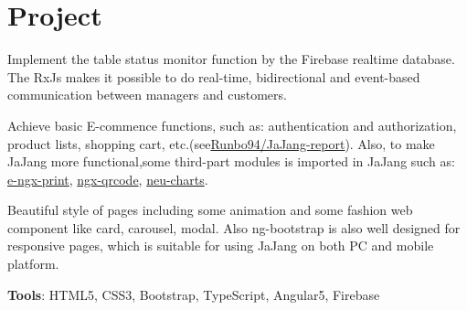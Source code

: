 \documentclass[letterpaper]{deedy-resume} %
\begin{document}
\hfill
%
%
\begin{minipage}[t]{0.66\textwidth} %


\section{Project}

\vspace{\topsep} %
\begin{tightitemize}
\item Implement the table status monitor function by the Firebase realtime database. The RxJs makes it possible to do real-time, bidirectional and event-based communication between managers and customers.
\item Achieve basic E-commence functions, such as: authentication and authorization, product lists, shopping cart, etc.(see\href{https://github.com/Runbo94/JaJang-report}{Runbo94/JaJang-report}). Also, to make JaJang more functional,some third-part modules is imported in JaJang such as: \href{https://github.com/laixiangran/e-ngx-print}{e-ngx-print}, \href{https://github.com/nacardin/ngx-qrcode}{ngx-qrcode},
\href{https://www.npmjs.com/package/neu-charts}{neu-charts}.
\item  Beautiful style of pages including some animation and some fashion web component like card, carousel, modal. Also ng-bootstrap is also well designed for responsive pages, which is suitable for using JaJang on both PC and mobile platform.
\item \textbf{Tools}: HTML5, CSS3, Bootstrap, TypeScript, Angular5, Firebase
\end{tightitemize}

\sectionspace %



\end{minipage}
\end{document}
